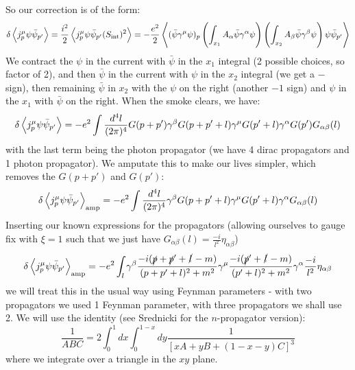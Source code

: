 So our correction is of the form:
\begin{equation}
    \delta \left< j^\mu_p \psi \bar{\psi}_{p'} \right> = \frac{i^2}{2}\left< j^\mu_p \psi \bar{\psi}_{p'}(S_{\text{int}})^2 \right> = -\frac{e^2}{2}\left< (\bar{\psi}\gamma^\mu \psi)_p \left(\int_{x_1}A_\alpha \bar{\psi}\gamma^\alpha \psi \right)\left(\int_{x_2}A_\beta \bar{\psi}\gamma^\beta \psi \right)\psi \bar{\psi}_{p'} \right>
\end{equation}
We contract the $\psi$ in the current with $\bar{\psi}$ in the $x_1$ integral (2 possible choices, so factor of 2), and then $\bar{\psi}$ in the current with $\psi$ in the $x_2$ integral (we get a $-$ sign), then remaining $\bar{\psi}$ in $x_2$ with the $\psi$ on the right (another $-1$ sign) and $\psi$ in the $x_1$ with $\bar{\psi}$ on the right. When the smoke clears, we have:
\begin{equation}
    \delta \left< j^\mu_p \psi \bar{\psi}_{p'} \right> = -e^2\int \frac{d^4l}{(2\pi)^4}G(p + p')\gamma^\beta G(p + p' + l)\gamma^\mu G(p' + l)\gamma^\alpha G(p') G_{\alpha\beta}(l)
\end{equation}
with the last term being the photon propagator (we have 4 dirac propagators and 1 photon propagator). We amputate this to make our lives simpler, which removes the $G(p + p')$ and $G(p')$:
\begin{equation}
    \delta \left< j^\mu_p \psi \bar{\psi}_{p'} \right>_{\text{amp}} = -e^2\int \frac{d^4l}{(2\pi)^4}\gamma^\beta G(p + p' + l)\gamma^\mu G(p' + l)\gamma^\alpha G_{\alpha\beta}(l)
\end{equation}
Inserting our known expressions for the propagators (allowing ourselves to gauge fix with $\xi = 1$ such that we just have $G_{\alpha\beta}(l) = \frac{-i}{l^2}\eta_{\alpha\beta}$)
\begin{equation}
    \delta \left< j^\mu_p \psi \bar{\psi}_{p'} \right>_{\text{amp}} = -e^2\int_l \gamma^\beta \frac{-i(\slashed{p} + \slashed{p}' + \slashed{l} - m)}{(p + p' + l)^2 + m^2}\gamma^\mu \frac{-i(\slashed{p}' + \slashed{l} - m)}{(p' + l)^2 + m^2}\gamma^\alpha \frac{-i}{l^2}\eta_{\alpha\beta}
\end{equation}
we will treat this in the usual way using Feynman parameters - with two propagators we used 1 Feynman parameter, with three propagators we shall use 2. We will use the identity (see Srednicki for the $n$-propagator version):
\begin{equation}
    \frac{1}{ABC} = 2\int_0^1 dx \int_0^{1-x}dy \frac{1}{[xA + yB + (1-x-y)C]^3}
\end{equation}
where we integrate over a triangle in the $xy$ plane. 
